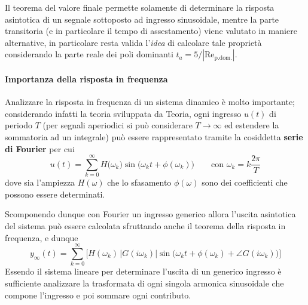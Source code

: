 		\vspace{3mm}
		
		Il teorema del valore finale permette solamente di determinare la risposta asintotica di un segnale sottoposto ad ingresso sinusoidale, mentre la parte transitoria (e in particolare il tempo di assestamento) viene valutato in maniere alternative, in particolare resta valida l'\textit{idea} di calcolare tale proprietà considerando la parte reale dei poli dominanti $t_a =  5 /\left|\textrm{Re}_\textrm{p.dom.}\right|$.
		
		\paragraph{Importanza della risposta in frequenza} Analizzare la risposta in frequenza di un sistema dinamico è molto importante; considerando infatti la teoria sviluppata da Teoria, ogni ingresso $u(t)$ di periodo $T$ (per segnali aperiodici si può considerare $T\rightarrow \infty$ ed estendere la sommatoria ad un integrale) può essere rappresentato tramite la cosiddetta \textbf{serie di Fourier} per cui
		\[ u(t) = \sum_{k=0}^\infty H\big(\omega_k\big) \sin\big(\omega_k t + \phi(\omega_k)\big) \qquad \textrm{con } \omega_k = k \frac{2\pi}{T} \]
		dove sia l'ampiezza $H(\omega)$ che lo sfasamento $\phi(\omega)$ sono dei coefficienti che possono essere determinati.
		
		Scomponendo dunque con Fourier un ingresso generico allora l'uscita asintotica del sistema può essere calcolata sfruttando anche il teorema della risposta in frequenza, e dunque
		\begin{equation}
			y_\infty(t) = \sum_{k=0}^\infty \Big[ H(\omega_k) \, \big|G(i\omega_k)\big| \sin\Big(\omega_kt + \phi(\omega_k) + \angle G(i\omega_k)\Big) \Big]
		\end{equation}
		Essendo il sistema lineare per determinare l'uscita di un generico ingresso è sufficiente analizzare la trasformata di ogni singola armonica sinusoidale che compone l'ingresso e poi sommare ogni contributo.	
			
			
			
			
			
			
			
			
			
			
			
			
			
			
			
			
	
		
		
	